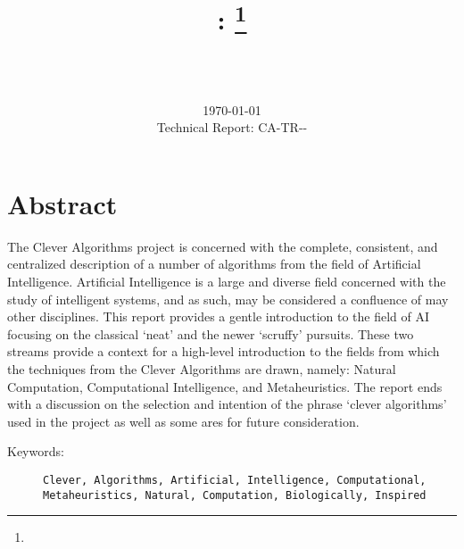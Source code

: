 \documentclass[a4paper, 11pt]{article}
\title{{\myreporttitle}: {\myreportsubtitle}\footnote{\myreportlicense}}
\author{\myreportauthor\\{\myreportemail}\\\small\myreportproject}
\date{\today\\{\small{Technical Report: CA-TR-{\myreportdate}-\myreportversion}}}
\begin{document}
\maketitle

\section*{Abstract} 
The Clever Algorithms project is concerned with the complete, consistent, and centralized description of a number of algorithms from the field of Artificial Intelligence.
Artificial Intelligence is a large and diverse field concerned with the study of intelligent systems, and as such, may be considered a confluence of may other disciplines.
This report provides a gentle introduction to the field of AI focusing on the classical `neat' and the newer `scruffy' pursuits. These two streams provide a context for a high-level introduction to the fields from which the techniques from the Clever Algorithms are drawn, namely: Natural Computation, Computational Intelligence, and Metaheuristics.
The report ends with a discussion on the selection and intention of the phrase `clever algorithms' used in the project as well as some ares for future consideration.

\begin{description}
	\item[Keywords:] {\small\texttt{Clever, Algorithms, Artificial, Intelligence, Computational, \\
	Metaheuristics, Natural, Computation, Biologically, Inspired}}
\end{description} 

\end{document}
